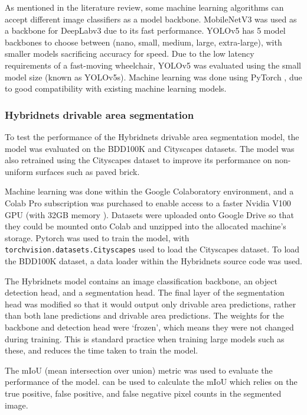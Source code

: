 As mentioned in the literature review, some machine learning algorithms can accept
different image classifiers as a model backbone.
MobileNetV3 \cite{howardSearchingMobileNetV32019} was used as a backbone for DeepLabv3 due to its fast performance.
YOLOv5 has 5 model backbones to choose between (nano, small, medium, large, extra-large),
with smaller models sacrificing accuracy for speed. Due to the low latency requirements
of a fast-moving wheelchair, YOLOv5 was evaluated using the small model size (known as YOLOv5s).
Machine learning was done using PyTorch \cite{paszkePyTorchImperativeStyle2019}, due to good compatibility
with existing machine learning models.

\subsubsection{Hybridnets drivable area segmentation}
To test the performance of the Hybridnets drivable area segmentation model,
the model was evaluated on the BDD100K and Cityscapes \cite{cordtsCityscapesDatasetSemantic2016}
datasets. The model was also retrained using the Cityscapes dataset
to improve its performance on non-uniform surfaces such as paved brick.

Machine learning was done within the Google Colaboratory environment,
and a Colab Pro subscription was purchased to enable access to
a faster Nvidia V100 GPU (with 32GB memory \cite{nvidiaNvidiaTeslaV1002018}).
Datasets were uploaded onto Google Drive so that they could be mounted onto Colab
and unzipped into the allocated machine's storage. Pytorch was used to train
the model, with \texttt{torchvision.datasets.Cityscapes} used to load the Cityscapes
dataset. To load the BDD100K dataset, a data loader within the Hybridnets source code
was used.

The Hybridnets model contains an image classification backbone, an object
detection head, and a segmentation head. The final layer of the segmentation head
was modified so that it would output only drivable area predictions, rather
than both lane predictions and drivable area predictions.
The weights for the backbone and detection head were `frozen', which means
they were not changed during training. This is standard practice when training
large models such as these, and reduces the time taken to train the model.

The mIoU (mean intersection over union) metric was used to evaluate the
performance of the model.  can be used to calculate the mIoU
which relies on the true positive, false positive, and false negative
pixel counts in the segmented image.


